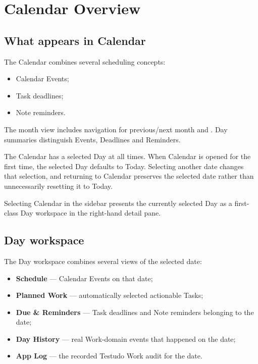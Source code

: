 \documentclass{testudomanual}
\begin{document}
\chapter{Calendar Overview}

\section{What appears in Calendar}

The Calendar combines several scheduling concepts:
\begin{itemize}
    \item Calendar Events;
    \item Task deadlines;
    \item Note reminders.
\end{itemize}

The month view includes navigation for previous/next month and . Day summaries distinguish Events, Deadlines and Reminders.

The Calendar has a selected Day at all times. When Calendar is opened for the first time, the selected Day defaults to Today. Selecting another date changes that selection, and returning to Calendar preserves the selected date rather than unnecessarily resetting it to Today.

Selecting Calendar in the sidebar presents the currently selected Day as a first-class Day workspace in the right-hand detail pane.

\section{Day workspace}

The Day workspace combines several views of the selected date:

\begin{itemize}
    \item \textbf{Schedule} --- Calendar Events on that date;
    \item \textbf{Planned Work} --- automatically selected actionable Tasks;
    \item \textbf{Due \& Reminders} --- Task deadlines and Note reminders belonging to the date;
    \item \textbf{Day History} --- real Work-domain events that happened on the date;
    \item \textbf{App Log} --- the recorded Testudo Work audit for the date.
\end{itemize}
\end{document}
